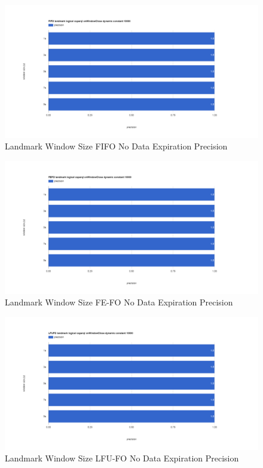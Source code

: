 \begin{figure}[!htbp]
    \centering
    \includegraphics[width=\textwidth]{img/app3-land-ws-fifo-no-p.png}
    \caption{Landmark Window Size FIFO No Data Expiration Precision}
\end{figure}
\begin{figure}[!htbp]
    \centering
    \includegraphics[width=\textwidth]{img/app3-land-ws-fefo-no-p.png}
    \caption{Landmark Window Size FE-FO No Data Expiration Precision}
\end{figure}
\begin{figure}[!htbp]
    \centering
    \includegraphics[width=\textwidth]{img/app3-land-ws-lfufo-no-p.png}
    \caption{Landmark Window Size LFU-FO No Data Expiration Precision}
\end{figure}
